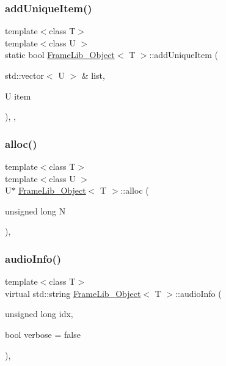 \subsubsection{\texorpdfstring{add\+Unique\+Item()}{addUniqueItem()}}
{\footnotesize\ttfamily template$<$class T$>$ \\
template$<$class U $>$ \\
static bool \hyperlink{class_frame_lib___object}{Frame\+Lib\+\_\+\+Object}$<$ T $>$\+::add\+Unique\+Item (\begin{DoxyParamCaption}\item[{std\+::vector$<$ U $>$ \&}]{list,  }\item[{U}]{item }\end{DoxyParamCaption})\hspace{0.3cm}{\ttfamily [inline]}, {\ttfamily [static]}, {\ttfamily [protected]}}

\mbox{\label{class_frame_lib___object_a32ba9cf8b728317fc92c10310ab83e67}} 
\subsubsection{\texorpdfstring{alloc()}{alloc()}}
{\footnotesize\ttfamily template$<$class T$>$ \\
template$<$class U $>$ \\
U$\ast$ \hyperlink{class_frame_lib___object}{Frame\+Lib\+\_\+\+Object}$<$ T $>$\+::alloc (\begin{DoxyParamCaption}\item[{unsigned long}]{N }\end{DoxyParamCaption})\hspace{0.3cm}{\ttfamily [inline]}, {\ttfamily [protected]}}

\mbox{\label{class_frame_lib___object_af618fcdec82b457911147c7c293bedd7}} 
\subsubsection{\texorpdfstring{audio\+Info()}{audioInfo()}}
{\footnotesize\ttfamily template$<$class T$>$ \\
virtual std\+::string \hyperlink{class_frame_lib___object}{Frame\+Lib\+\_\+\+Object}$<$ T $>$\+::audio\+Info (\begin{DoxyParamCaption}\item[{unsigned long}]{idx,  }\item[{bool}]{verbose = {\ttfamily false} }\end{DoxyParamCaption})\hspace{0.3cm}{\ttfamily [inline]}, {\ttfamily [virtual]}}



